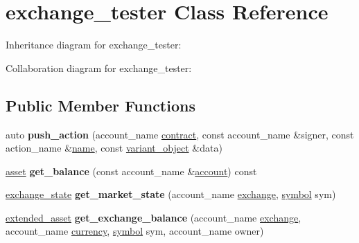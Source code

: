 \hypertarget{classexchange__tester}{}\section{exchange\+\_\+tester Class Reference}
\label{classexchange__tester}


Inheritance diagram for exchange\+\_\+tester\+:


Collaboration diagram for exchange\+\_\+tester\+:
\subsection*{Public Member Functions}
\begin{DoxyCompactItemize}
\item 
\mbox{\label{classexchange__tester_a50120b10f31cc747a71dca83d45ef3c7}} 
auto {\bfseries push\+\_\+action} (account\+\_\+name \mbox{\hyperlink{structaacio_1_1contract}{contract}}, const account\+\_\+name \&signer, const action\+\_\+name \&\mbox{\hyperlink{structaacio_1_1name}{name}}, const \mbox{\hyperlink{classfc_1_1variant__object}{variant\+\_\+object}} \&data)
\item 
\mbox{\label{classexchange__tester_a502a4b581e5bc2ffa76abb1226e2b3f8}} 
\mbox{\hyperlink{structaacio_1_1asset}{asset}} {\bfseries get\+\_\+balance} (const account\+\_\+name \&\mbox{\hyperlink{structaccount}{account}}) const
\item 
\mbox{\label{classexchange__tester_a4f45fdd6a6c6d13126b678b6ae712682}} 
\mbox{\hyperlink{structaacio_1_1exchange__state}{exchange\+\_\+state}} {\bfseries get\+\_\+market\+\_\+state} (account\+\_\+name \mbox{\hyperlink{classaacio_1_1exchange}{exchange}}, \mbox{\hyperlink{classaacio_1_1chain_1_1symbol}{symbol}} sym)
\item 
\mbox{\label{classexchange__tester_afd1ac9665068351b2a03eb1766815caa}} 
\mbox{\hyperlink{structaacio_1_1extended__asset}{extended\+\_\+asset}} {\bfseries get\+\_\+exchange\+\_\+balance} (account\+\_\+name \mbox{\hyperlink{classaacio_1_1exchange}{exchange}}, account\+\_\+name \mbox{\hyperlink{classaacio_1_1currency}{currency}}, \mbox{\hyperlink{classaacio_1_1chain_1_1symbol}{symbol}} sym, account\+\_\+name owner)
\item 

\end{DoxyCompactItemize}
